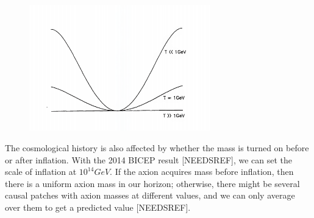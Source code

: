 \documentclass[12pt, twosides]{book}
\begin{document}
\begin{figure}
\includegraphics[width=0.7\textwidth]{differentpotentials}
\end{figure}

The cosmological history is also affected by whether the mass is turned on before or after inflation. With the 2014 BICEP result [NEEDSREF], we can set the scale of inflation at $10^{14} GeV$. If the axion acquires mass before inflation, then there is a uniform axion mass in our horizon; otherwise, there might be several causal patches with axion masses at different values, and we can only average over them to get a predicted value [NEEDSREF].



\end{document}
